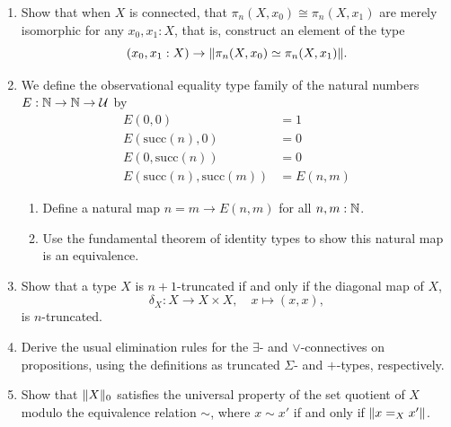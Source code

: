 \documentclass[10pt,oneside,leqno,openright]{memoir}
\begin{document}
\begin{enumerate}
  \item Show that when $X$ is connected, that $\pi_n(X, x_0) \cong \pi_n(X, x_1)$ are merely isomorphic for any $x_0, x_1 : X$, that is, construct an element of the type
    \[
      (x_0, x_1: X) \to \lVert\pi_n(X,x_0) \simeq \pi_n(X,x_1)\rVert.
    \]

    \item We define the observational equality type family of the natural numbers $E : \mathbb{N} \to \mathbb{N} \to \mathcal{U}$  by
        \begin{align*}
            E(0,0) &= 1 \\
            E(\mathrm{succ}(n), 0) &= 0 \\
            E(0, \mathrm{succ}(n)) &= 0 \\
            E(\mathrm{succ}(n), \mathrm{succ}(m)) &= E(n,m)
        \end{align*}
        \begin{enumerate}
            \item Define a natural map $n = m \to E(n,m)$ for all $n, m : \mathbb{N}$.
            \item Use the fundamental theorem of identity types to show this natural map is an equivalence.
        \end{enumerate}

  \item Show that a type $X$ is $n+1$-truncated if and only if the diagonal map of $X$,
    \[\delta_X : X \to X\times X,\quad x\mapsto (x,x),\]
    is $n$-truncated.

  \item Derive the usual elimination rules for the $\exists$- and
    $\vee$-connectives on propositions, using the definitions as truncated
    $\Sigma$- and $+$-types, respectively.

  \item Show that $\lVert X\rVert_0$ satisfies the universal property of the set
    quotient of $X$ modulo the equivalence relation $\sim$, where $x\sim x'$ if
    and only if $\lVert x=_X x'\rVert$.




\end{enumerate}
\end{document}
